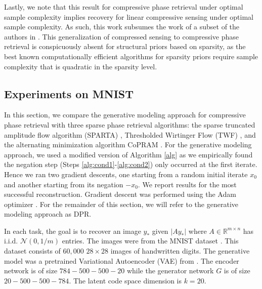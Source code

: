 \documentclass[11pt]{article}
\newcommand{\R}{\mathbb{R}}
\newcommand{\G}{G}
\newcommand{\red}[1]{{\color{red} {#1}}}
\theoremstyle{remark}
\begin{document}
Lastly, we note that this result for compressive phase retrieval under optimal sample complexity implies recovery for linear compressive sensing under optimal sample complexity.  As such, this work subsumes the work of a subset of the authors in \cite{HV2017}.  This generalization of compressed sensing to compressive phase retrieval is conspicuously absent for structural priors based on sparsity, as the best known computationally efficient algorithms for sparsity priors require sample complexity that is quadratic in the sparsity level.





\subsection{Experiments on MNIST} \label{experiments section}

In this section, we compare the generative modeling approach for compressive phase retrieval with three sparse phase retrieval algorithms: the sparse truncated amplitude flow algorithm (SPARTA) \cite{SPARTA}, Thresholded Wirtinger Flow (TWF) \cite{Cai2016}, and the alternating minimization algorithm CoPRAM \cite{Hedge2017}. For the generative modeling approach, we used a modified version of Algorithm \ref{alg} as we empirically found the negation step (Steps \ref{alg:cond1}-\ref{alg:cond2}) only occurred at the first iterate. Hence we ran two gradient descents, one starting from a random initial iterate $x_0$ and another starting from its negation $-x_0$. We report results for the most successful reconstruction. Gradient descent was performed using the Adam optimizer \cite{ADAM}. For the remainder of this section, we will refer to the generative modeling approach as DPR. %

In each task, the goal is to recover an image $y_*$ given $|Ay_*|$ where $A \in \R^{m \times n}$ has i.i.d. $\mathcal{N}(0,1/m)$ entries. The images were from the MNIST dataset \cite{MNIST}. This dataset consists of $60,000$ $28 \times 28$ images of handwritten digits. The generative model was a pretrained Variational Autoencoder (VAE) from \cite{Price2017}. The encoder network is of size $784 - 500 - 500 - 20$ while the generator network $\G$ is of size $20 - 500 - 500 - 784$. The latent code space dimension is $k = 20$.
\end{document}
